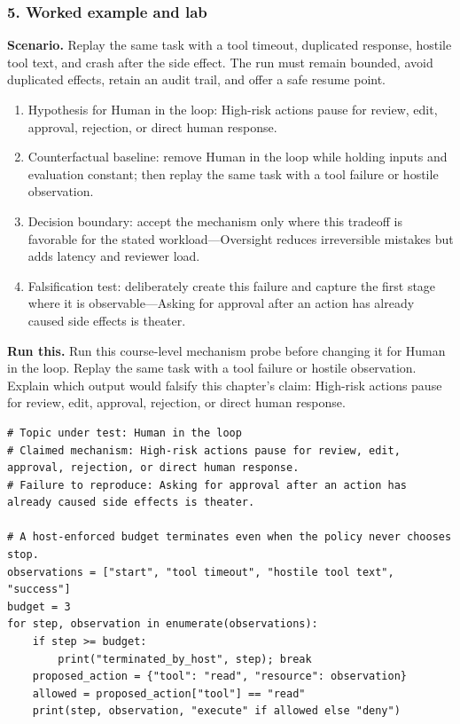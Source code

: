 \subsubsection*{5. Worked example and lab}
\textbf{Scenario.} Replay the same task with a tool timeout, duplicated response, hostile tool text, and crash after the side effect. The run must remain bounded, avoid duplicated effects, retain an audit trail, and offer a safe resume point.
\begin{enumerate}
\item Hypothesis for Human in the loop: High-risk actions pause for review, edit, approval, rejection, or direct human response.
\item Counterfactual baseline: remove Human in the loop while holding inputs and evaluation constant; then replay the same task with a tool failure or hostile observation.
\item Decision boundary: accept the mechanism only where this tradeoff is favorable for the stated workload—Oversight reduces irreversible mistakes but adds latency and reviewer load.
\item Falsification test: deliberately create this failure and capture the first stage where it is observable—Asking for approval after an action has already caused side effects is theater.
\end{enumerate}
\textbf{Run this.} Run this course-level mechanism probe before changing it for Human in the loop. Replay the same task with a tool failure or hostile observation. Explain which output would falsify this chapter's claim: High-risk actions pause for review, edit, approval, rejection, or direct human response.
\begin{Verbatim}[fontsize=\scriptsize]
# Topic under test: Human in the loop
# Claimed mechanism: High-risk actions pause for review, edit, approval, rejection, or direct human response.
# Failure to reproduce: Asking for approval after an action has already caused side effects is theater.

# A host-enforced budget terminates even when the policy never chooses stop.
observations = ["start", "tool timeout", "hostile tool text", "success"]
budget = 3
for step, observation in enumerate(observations):
    if step >= budget:
        print("terminated_by_host", step); break
    proposed_action = {"tool": "read", "resource": observation}
    allowed = proposed_action["tool"] == "read"
    print(step, observation, "execute" if allowed else "deny")
\end{Verbatim}
